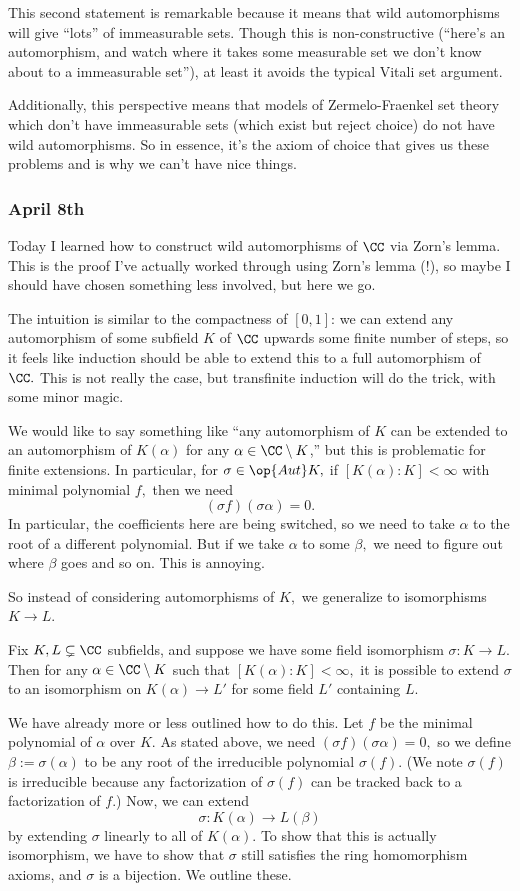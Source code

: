 This second statement is remarkable because it means that wild automorphisms will give ``lots'' of immeasurable sets. Though this is non-constructive (``here's an automorphism, and watch where it takes some measurable set we don't know about to a immeasurable set''), at least it avoids the typical Vitali set argument.

Additionally, this perspective means that models of Zermelo-Fraenkel set theory which don't have immeasurable sets (which exist but reject choice) do not have wild automorphisms. So in essence, it's the axiom of choice that gives us these problems and is why we can't have nice things.

\subsubsection{April 8th}
Today I learned how to construct wild automorphisms of $\CC$ via Zorn's lemma. This is the proof I've actually worked through using Zorn's lemma (!), so maybe I should have chosen something less involved, but here we go.

The intuition is similar to the compactness of $[0,1]$: we can extend any automorphism of some subfield $K$ of $\CC$ upwards some finite number of steps, so it feels like induction should be able to extend this to a full automorphism of $\CC.$ This is not really the case, but transfinite induction will do the trick, with some minor magic.

We would like to say something like ``any automorphism of $K$ can be extended to an automorphism of $K(\alpha)$ for any $\alpha\in\CC\setminus K$,'' but this is problematic for finite extensions. In particular, for $\sigma\in\op{Aut}K,$ if $[K(\alpha):K]<\infty$ with minimal polynomial $f,$ then we need
\[(\sigma f)(\sigma\alpha)=0.\]
In particular, the coefficients here are being switched, so we need to take $\alpha$ to the root of a different polynomial. But if we take $\alpha$ to some $\beta,$ we need to figure out where $\beta$ goes and so on. This is annoying.

So instead of considering automorphisms of $K,$ we generalize to isomorphisms $K\to L.$
\begin{lemma}
    Fix $K,L\subsetneq\CC$ subfields, and suppose we have some field isomorphism $\sigma:K\to L.$ Then for any $\alpha\in\CC\setminus K$ such that $[K(\alpha):K]<\infty,$ it is possible to extend $\sigma$ to an isomorphism on $K(\alpha)\to L'$ for some field $L'$ containing $L.$
\end{lemma}
We have already more or less outlined how to do this. Let $f$ be the minimal polynomial of $\alpha$ over $K.$ As stated above, we need $(\sigma f)(\sigma\alpha)=0,$ so we define $\beta:=\sigma(\alpha)$ to be any root of the irreducible polynomial $\sigma(f).$ (We note $\sigma(f)$ is irreducible because any factorization of $\sigma(f)$ can be tracked back to a factorization of $f.$) Now, we can extend
\[\sigma:K(\alpha)\to L(\beta)\]
by extending $\sigma$ linearly to all of $K(\alpha).$ To show that this is actually isomorphism, we have to show that $\sigma$ still satisfies the ring homomorphism axioms, and $\sigma$ is a bijection. We outline these.

